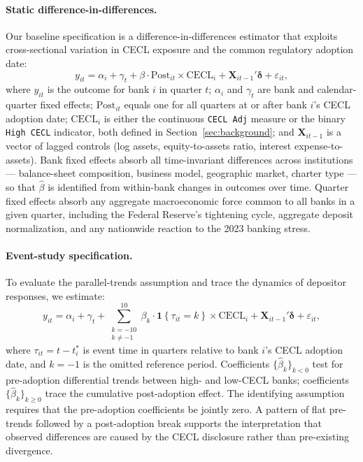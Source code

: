 \paragraph{Static difference-in-differences.}
Our baseline specification is a difference-in-differences estimator that
exploits cross-sectional variation in CECL exposure and the common
regulatory adoption date:
\begin{equation}
  y_{it}
  = \alpha_i + \gamma_t
  + \beta \cdot \mathrm{Post}_{it} \times \mathrm{CECL}_i
  + \mathbf{X}_{it-1}'\boldsymbol{\delta}
  + \varepsilon_{it},
  \label{eq:did}
\end{equation}
where $y_{it}$ is the outcome for bank $i$ in quarter $t$; $\alpha_i$ and
$\gamma_t$ are bank and calendar-quarter fixed effects; $\mathrm{Post}_{it}$
equals one for all quarters at or after bank $i$'s CECL adoption date;
$\mathrm{CECL}_i$ is either the continuous \texttt{CECL Adj} measure or the
binary \texttt{High CECL} indicator, both defined in
Section~\ref{sec:background}; and $\mathbf{X}_{it-1}$ is a vector of lagged
controls (log assets, equity-to-assets ratio, interest expense-to-assets).
Bank fixed effects absorb all time-invariant differences across institutions
--- balance-sheet composition, business model, geographic market, charter type
--- so that $\hat{\beta}$ is identified from within-bank changes in outcomes
over time.  Quarter fixed effects absorb any aggregate macroeconomic force
common to all banks in a given quarter, including the Federal Reserve's
tightening cycle, aggregate deposit normalization, and any nationwide
reaction to the 2023 banking stress.

\paragraph{Event-study specification.}
To evaluate the parallel-trends assumption and trace the dynamics of depositor
responses, we estimate:
\begin{equation}
  y_{it}
  = \alpha_i + \gamma_t
  + \sum_{\substack{k=-10 \\ k \neq -1}}^{10}
    \beta_k \cdot \mathbf{1}\!\left\{\tau_{it} = k\right\}
    \times \mathrm{CECL}_i
  + \mathbf{X}_{it-1}'\boldsymbol{\delta}
  + \varepsilon_{it},
  \label{eq:eventstudy}
\end{equation}
where $\tau_{it} = t - t_i^{*}$ is event time in quarters relative to bank
$i$'s CECL adoption date, and $k = -1$ is the omitted reference period.
Coefficients $\{\hat{\beta}_k\}_{k < 0}$ test for pre-adoption differential
trends between high- and low-CECL banks; coefficients $\{\hat{\beta}_k\}_{k
\geq 0}$ trace the cumulative post-adoption effect.  The identifying assumption
requires that the pre-adoption coefficients be jointly zero.  A pattern of flat pre-trends followed by a post-adoption break
supports the interpretation that observed differences are caused by the CECL
disclosure rather than pre-existing divergence.

